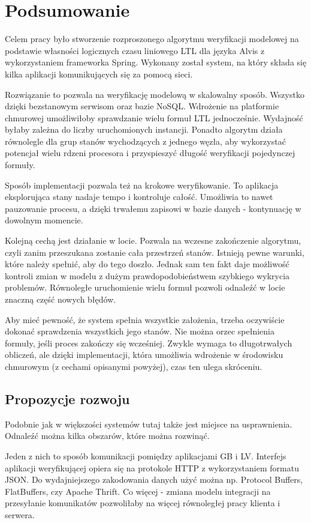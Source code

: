 \chapter{Podsumowanie}

Celem pracy było stworzenie rozproszonego algorytmu weryfikacji modelowej na podstawie własności logicznych czasu liniowego LTL dla języka Alvis z wykorzystaniem frameworka Spring.
Wykonany został system, na który składa się kilka aplikacji komunikujących się za pomocą sieci.

Rozwiązanie to pozwala na weryfikację modelową w skalowalny sposób.
Wszystko dzięki bezstanowym serwisom oraz bazie NoSQL.
Wdrożenie na platformie chmurowej umożliwiłoby sprawdzanie wielu formuł LTL jednocześnie.
Wydajność byłaby zależna do liczby uruchomionych instancji.
Ponadto algorytm działa równolegle dla grup stanów wychodzących z jednego węzła, aby wykorzystać potencjał wielu rdzeni procesora i przyspieszyć długość weryfikacji pojedynczej formuły.

Sposób implementacji pozwala też na krokowe weryfikowanie.
To aplikacja eksplorująca stany nadaje tempo i kontroluje całość.
Umożliwia to nawet pauzowanie procesu, a dzięki trwałemu zapisowi w bazie danych - kontynuację w dowolnym momencie.

Kolejną cechą jest działanie w locie.
Pozwala na wczesne zakończenie algorytmu, czyli zanim przeszukana zostanie cała przestrzeń stanów.
Istnieją pewne warunki, które należy spełnić, aby do tego doszło.
Jednak sam ten fakt daje możliwość kontroli zmian w modelu z dużym prawdopodobieństwem szybkiego wykrycia problemów.
Równoległe uruchomienie wielu formuł pozwoli odnaleźć w locie znaczną część nowych błędów.

Aby mieć pewność, że system spełnia wszystkie założenia, trzeba oczywiście dokonać sprawdzenia wszystkich jego stanów.
Nie można orzec spełnienia formuły, jeśli proces zakończy się wcześniej.
Zwykle wymaga to długotrwałych obliczeń, ale dzięki implementacji, która umożliwia wdrożenie w środowisku chmurowym (z cechami opisanymi powyżej), czas ten ulega skróceniu.


\section{Propozycje rozwoju}

Podobnie jak w większości systemów tutaj także jest miejsce na usprawnienia.
Odnaleźć można kilka obszarów, które można rozwinąć.

Jeden z nich to sposób komunikacji pomiędzy aplikacjami GB i LV.
Interfejs aplikacji weryfikującej opiera się na protokole HTTP z wykorzystaniem formatu JSON.
Do wydajniejszego zakodowania danych użyć można np. Protocol Buffers, FlatBuffers, czy Apache Thrift.
Co więcej - zmiana modelu integracji na przesyłanie komunikatów pozwoliłaby na więcej równoległej pracy klienta i serwera.

